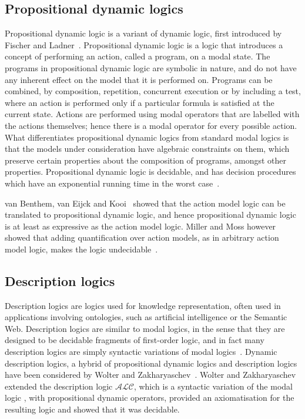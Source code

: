 \subsection{Propositional dynamic logics}

Propositional dynamic logic is a variant of dynamic logic, first introduced by
Fischer and Ladner~\cite{fischer1979propositional}. Propositional dynamic logic
is a logic that introduces a concept of performing an action, called a program,
on a modal state. The programs in propositional dynamic logic are symbolic in
nature, and do not have any inherent effect on the model that it is performed
on. Programs can be combined, by composition, repetition, concurrent execution
or by including a test, where an action is performed only if a particular
formula is satisfied at the current state. Actions are performed using modal
operators that are labelled with the actions themselves; hence there is a modal
operator for every possible action. What differentiates propositional dynamic
logics from standard modal logics is that the models under consideration have
algebraic constraints on them, which preserve certain properties about the
composition of programs, amongst other properties. Propositional dynamic logic
is decidable, and has decision procedures which have an exponential running time
in the worst case~\cite{pratt1980near}.

van Benthem, van Eijck and Kooi~\cite{vanbenthem2006logics} showed that the
action model logic can be translated to propositional dynamic logic, and hence
propositional dynamic logic is at least as expressive as the action model logic.
Miller and Moss however showed that adding quantification over action models, as
in arbitrary action model logic, makes the logic
undecidable~\cite{miller2005undecidability}.

\subsection{Description logics}

Description logics are logics used for knowledge representation, often used in
applications involving ontologies, such as artificial intelligence or the
Semantic Web. Description logics are similar to modal logics, in the sense that
they are designed to be decidable fragments of first-order logic, and in fact
many description logics are simply syntactic variations of modal
logics~\cite{blackburn2002modal}. Dynamic description logics, a hybrid of
propositional dynamic logics and description logics have been considered by
Wolter and Zakharyaschev~\cite{wolter1998dynamic}. Wolter and Zakharyaschev
extended the description logic $\mathcal{ALC}$, which is a syntactic variation of
the modal logic \logicK{}, with propositional dynamic operators, provided an
axiomatisation for the resulting logic and showed that it was decidable.


